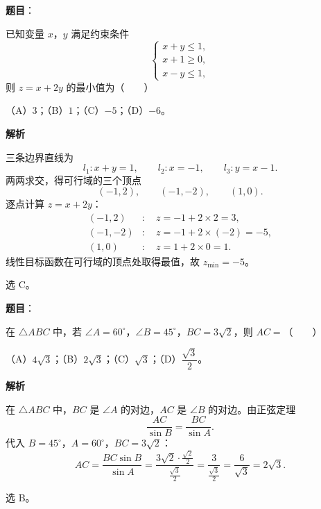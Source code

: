 \begin{answer}

\textbf{题目}：

已知变量 $x$，$y$ 满足约束条件
\nopagebreak[4]
\[\begin{cases}x+y\leqslant1,\\ x+1\geqslant0,\\ x-y\leqslant1,\end{cases}\]
则 $z=x+2y$ 的最小值为\mbox{（　　）}

（A）$3$；（B）$1$；（C）$-5$；（D）$-6$。

\textbf{解析}

三条边界直线为
\nopagebreak[4]
\[l_1:x+y=1,\qquad l_2:x=-1,\qquad l_3:y=x-1.\]
两两求交，得可行域的三个顶点
\nopagebreak[4]
\[(-1,2),\qquad (-1,-2),\qquad (1,0).\]
逐点计算 $z=x+2y$：
\nopagebreak[4]
\[\begin{aligned}
(-1,2)&:\quad z=-1+2\times2=3,\\
(-1,-2)&:\quad z=-1+2\times(-2)=-5,\\
(1,0)&:\quad z=1+2\times0=1.
\end{aligned}\]
线性目标函数在可行域的顶点处取得最值，故 $z_{\min}=-5$。

选 C。


\end{answer}
\begin{answer}

\textbf{题目}：

在 $\triangle ABC$ 中，若 $\angle A=60^\circ$，$\angle B=45^\circ$，$BC=3\sqrt2$，则 $AC=$\mbox{（　　）}

（A）$4\sqrt3$；（B）$2\sqrt3$；（C）$\sqrt3$；（D）$\dfrac{\sqrt3}{2}$。

\textbf{解析}

在 $\triangle ABC$ 中，$BC$ 是 $\angle A$ 的对边，$AC$ 是 $\angle B$ 的对边。由正弦定理
\nopagebreak[4]
\[\frac{AC}{\sin B}=\frac{BC}{\sin A}.\]
代入 $B=45^\circ$，$A=60^\circ$，$BC=3\sqrt2$：
\nopagebreak[4]
\[AC=\frac{BC\sin B}{\sin A}=\frac{3\sqrt2\cdot\frac{\sqrt2}{2}}{\frac{\sqrt3}{2}}=\frac{3}{\frac{\sqrt3}{2}}=\frac{6}{\sqrt3}=2\sqrt3.\]

选 B。


\end{answer}
